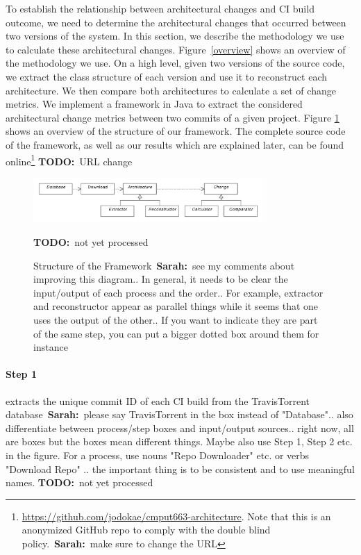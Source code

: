 \documentclass[sigplan, anonymous, review]{acmart}
\newcommand{\sn}[1]{{\color{blue}\textbf{Sarah:}~#1}}
\newcommand{\todo}[1]{{ \color{red} \textbf{TODO:}~#1}}
\begin{document}


To establish the relationship between architectural changes and CI build outcome, we need to determine the architectural changes that occurred between two versions of the system.
In this section, we describe the methodology we use to calculate these architectural changes.
Figure~\ref{overview} shows an overview of the methodology we use.
On a high level, given two versions of the source code, we extract the class structure of each version and use it to reconstruct each architecture. We then compare both architectures to calculate a set of change metrics. 
We implement a framework in Java to extract the considered architectural change metrics between two commits of a given project.
Figure \ref{frameworkStructure} shows an overview of the structure of our framework.
The complete source code of the framework, as well as our results which are explained later, can be found online\footnote{\url{https://github.com/jodokae/cmput663-architecture}. Note that this is an anonymized GitHub repo to comply with the double blind policy.~\sn{make sure to change the URL}} \todo{URL change}

\begin{figure}[!t]
	\centering
	\includegraphics[width=3.45in]{assets/architecture.pdf}
	\caption{Structure of the Framework~\sn{see my comments about improving this diagram.. In general, it needs to be clear the input/output of each process and the order.. For example, extractor and reconstructor appear as parallel things while it seems that one uses the output of the other.. If you want to indicate they are part of the same step, you can put a bigger dotted box around them for instance}} \todo{not yet processed}
	\label{frameworkStructure}
\end{figure}


 
\paragraph{Step 1} extracts the unique commit ID of each CI build from the TravisTorrent database~\sn{please say TravisTorrent in the box instead of "Database".. also differentiate between process/step boxes and input/output sources.. right now, all are boxes but the boxes mean different things. Maybe also use Step 1, Step 2 etc. in the figure. For a process, use nouns "Repo Downloader" etc. or verbs "Download Repo" .. the important thing is to be consistent and to use meaningful names}. \todo{not yet processed}
\end{document}
